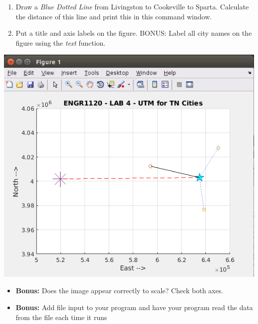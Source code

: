 \documentclass[11pt]{article}
\begin{document}
\begin{description}
\begin{enumerate}
	\item Draw a {\it Blue Dotted Line} from Livingston to Cookeville to Sparta. Calculate the distance of this line and print this in this command window.

	\item Put a title and axis labels on the figure.  BONUS: Label all city names on the figure using the {\it text} function.
	
   
        \end{enumerate}
    
    \includegraphics[scale=0.8]{lab4_fig2.png}
    
    \begin{itemize}

         \item \textbf{Bonus:} Does the image appear correctly to scale? Check both axes.

         \item \textbf{Bonus:} Add file input to your program and have your program read the data from the file each time it runs 


    \end{itemize} 


    \end{description}
 
\end{document}
